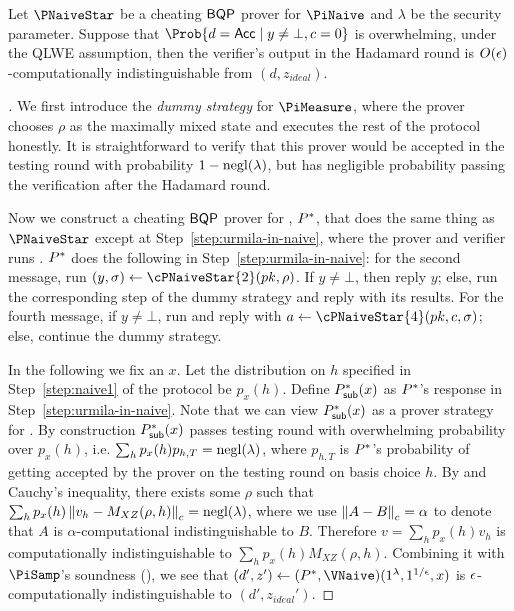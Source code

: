 \begin{theorem}
	\label{lem:naive-qpip0-binding}
	Let $\PNaiveStar$ be a cheating $\operatorname{\mathsf{BQP}}$ prover for $\PiNaive$ and $\lambda$ be the security parameter.
	Suppose that $\Prob{d=\Acc\mid y\ne\bot, c=0}$ is overwhelming, 
	under the QLWE assumption, then the verifier's output in the Hadamard round is $O(\epsilon)$-computationally indistinguishable from $(d, z_{ideal})$.
\end{theorem}
\begin{proof}[]
	We first introduce the \emph{dummy strategy} for $\PiMeasure$, where the prover chooses $\rho$ as the maximally mixed state and executes the rest of the protocol honestly.
	It is straightforward to verify that this prover would be accepted in the testing round with probability $1-\operatorname{negl}(\lambda)$,
	but has negligible probability passing the verification  after the Hadamard round.

	Now we construct a cheating $\operatorname{\mathsf{BQP}}$ prover for , $P^*$, that does the same thing as $\PNaiveStar$ except at Step~\ref{step:urmila-in-naive}, where the prover and verifier runs . $P^*$ does the following in Step~\ref{step:urmila-in-naive}:
	for the second message, run $(y, \sigma)\leftarrow\cPNaiveStar{2}(pk, \rho)$.
	If $y\ne\bot$, then reply $y$;
	else, run the corresponding step of the dummy strategy and reply with its results.
	For the fourth message, if $y\ne\bot$, run and reply with $a\leftarrow\cPNaiveStar{4}(pk, c, \sigma)$;
	else, continue the dummy strategy.

	 In the following we fix an $x$. Let the distribution on $h$ specified in Step~\ref{step:naive1} of the protocol be $p_x(h)$. Define $P^*_{\mathsf{sub}}(x)$ as $P^*$'s response in Step~\ref{step:urmila-in-naive}. Note that we can view $P^*_{\mathsf{sub}}(x)$ as a prover strategy for . By construction $P^*_{\mathsf{sub}}(x)$ passes testing round with overwhelming probability over $p_x(h)$, i.e. $\sum_h p_x(h) p_{h,T} =\operatorname{negl}(\lambda)$, where $p_{h,T}$ is $P^*$'s probability of getting accepted by the prover on the testing round on basis choice $h$. By  and Cauchy's inequality, there exists some $\rho$ such that  $\sum_h p_x(h) \left\lVert v_h -M_{XZ}(\rho, h)\right\rVert_c = \operatorname{negl}(\lambda)$, where we use $\left\lVert A-B\right\rVert_c=\alpha$ to denote that $A$ is $\alpha$-computational indistinguishable to $B$. Therefore $v= \sum_h p_x(h) v_h$ is computationally indistinguishable to $\sum_h p_x(h) M_{XZ}(\rho, h)$. Combining it with $\PiSamp$'s soundness (), 
	we see that $(d', z')\leftarrow(\Pstar, \VNaive)(1^\lambda, 1^{1/\epsilon}, x)$  is $\epsilon$-computationally indistinguishable to $(d', z_{ideal}')$.


\end{proof}
